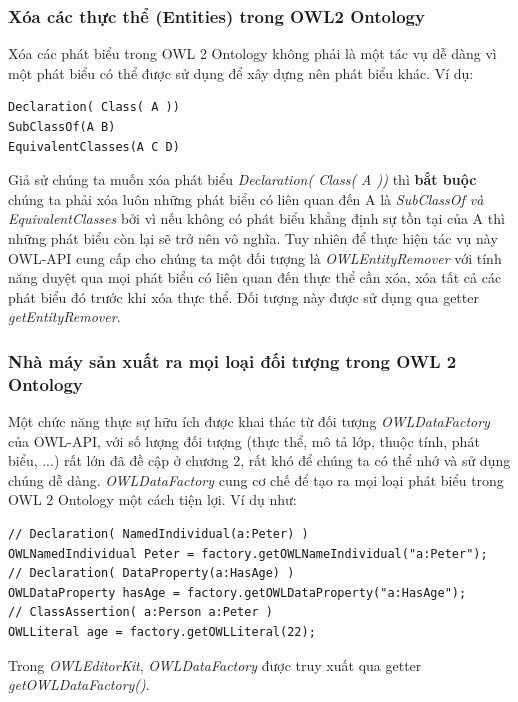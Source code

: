 \subsubsection{Xóa các thực thể (Entities) trong OWL2 Ontology}
Xóa các phát biểu trong OWL 2 Ontology không phải là một tác vụ dễ dàng vì một phát biểu có thể được sử dụng để xây dựng nên phát biểu khác. Ví dụ:
\begin{verbatim}
Declaration( Class( A ))
SubClassOf(A B)
EquivalentClasses(A C D)
\end{verbatim}
Giả sử chúng ta muốn xóa phát biểu \textit{Declaration( Class( A ))} thì \textbf{bắt buộc} chúng ta phải xóa luôn những phát biểu có liên quan đến A là \textit{SubClassOf và EquivalentClasses} bởi vì nếu không có phát biểu khẳng định sự tồn tại của A thì những phát biểu còn lại sẽ trở nên vô nghĩa. Tuy nhiên để thực hiện tác vụ này OWL-API cung cấp cho chúng ta một đối tượng là \textit{OWLEntityRemover} với tính năng duyệt qua mọi phát biểu có liên quan đến thực thể cần xóa, xóa tất cả các phát biểu đó trước khi xóa thực thể. Đối tượng này được sử dụng qua getter \textit{getEntityRemover}.

\subsubsection{Nhà máy sản xuất ra mọi loại đối tượng trong OWL 2 Ontology}
Một chức năng thực sự hữu ích được khai thác từ đối tượng \textit{OWLDataFactory} của OWL-API, với số lượng đối tượng (thực thể, mô tả lớp, thuộc tính, phát biểu, ...) rất lớn đã đề cập ở chương 2, rất khó để chúng ta có thể nhớ và sử dụng chúng dễ dàng. \textit{OWLDataFactory} cung cơ chế để tạo ra mọi loại phát biểu trong OWL 2 Ontology một cách tiện lợi. Ví dụ như:
\begin{verbatim}
// Declaration( NamedIndividual(a:Peter) )
OWLNamedIndividual Peter = factory.getOWLNameIndividual("a:Peter");
// Declaration( DataProperty(a:HasAge) )
OWLDataProperty hasAge = factory.getOWLDataProperty("a:HasAge");
// ClassAssertion( a:Person a:Peter )
OWLLiteral age = factory.getOWLLiteral(22);
\end{verbatim}
Trong \textit{OWLEditorKit}, \textit{OWLDataFactory} được truy xuất qua getter \textit{getOWLDataFactory()}.

